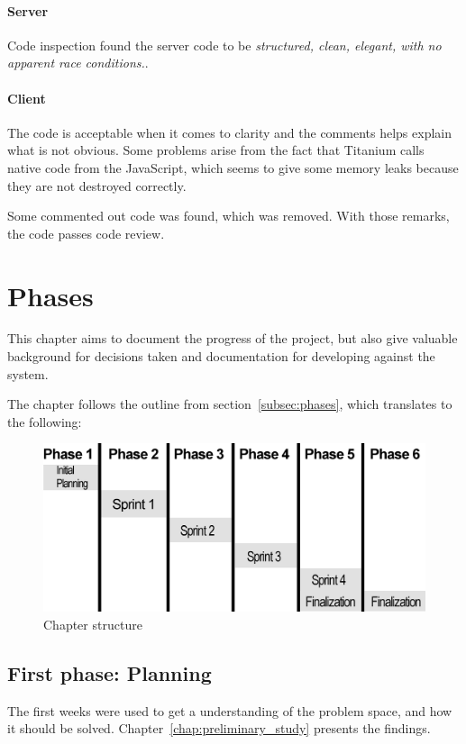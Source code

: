\documentclass[11pt]{book}
\begin{document}
\subsubsection{Server}

Code inspection found the server code to be \emph{structured, clean, elegant, with no apparent race conditions.}.

\subsubsection{Client}
The code is acceptable when it comes to clarity and the comments helps explain what is not obvious. Some problems arise from the fact that Titanium calls native code from the JavaScript, which seems to give some memory leaks because they are not destroyed correctly.

Some commented out code was found, which was removed.
With those remarks, the code passes code review.

\chapter{Phases}
This chapter aims to document the progress of the project, but also give valuable background for decisions taken and documentation for developing against the system.

The chapter follows the outline from section~\ref{subsec:phases}, which translates to the following:
\begin{figure}[H]
    \centering
    \includegraphics[width=1.0\textwidth]{Figures/Phases/phases.png}
    \caption{Chapter structure}
    \label{fig:phases_structure}
\end{figure}

\section{First phase: Planning}
The first weeks were used to get a understanding of the problem space, and how it should be solved. Chapter~\ref{chap:preliminary_study} presents the findings.
\end{document}
